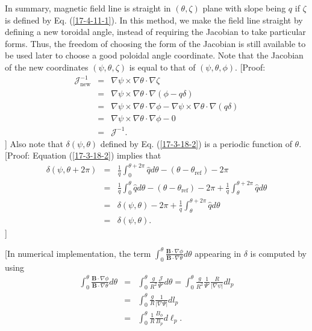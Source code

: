 \documentclass{llncs}
\newcommand{\tmop}[1]{\ensuremath{\operatorname{#1}}}
\begin{document}
In summary, magnetic field line is straight in $(\theta, \zeta)$ plane with
slope being $q$ if $\zeta$ is defined by Eq. (\ref{17-4-11-1}). In this
method, we make the field line straight by defining a new toroidal angle,
instead of requiring the Jacobian to take particular forms. Thus, the freedom
of choosing the form of the Jacobian is still available to be used later to
choose a good poloidal angle coordinate. Note that the Jacobian of the new
coordinates $(\psi, \theta, \zeta)$ is equal to that of $(\psi, \theta,
\phi)$. [Proof:
\begin{eqnarray*}
  \mathcal{J}_{\tmop{new}}^{- 1} & = & \nabla \psi \times \nabla \theta \cdot
  \nabla \zeta\\
  & = & \nabla \psi \times \nabla \theta \cdot \nabla (\phi - q \delta)\\
  & = & \nabla \psi \times \nabla \theta \cdot \nabla \phi - \nabla \psi
  \times \nabla \theta \cdot \nabla (q \delta)\\
  & = & \nabla \psi \times \nabla \theta \cdot \nabla \phi - 0\\
  & = & \mathcal{J}^{- 1} .
\end{eqnarray*}
] Also note that $\delta (\psi, \theta)$ defined by Eq. (\ref{17-3-18-2}) is a
periodic function of $\theta$. [Proof: Equation (\ref{17-3-18-2}) implies that
\begin{eqnarray}
  \delta (\psi, \theta + 2 \pi) & = & \frac{1}{q} \int_0^{\theta + 2 \pi}
  \hat{q} d \theta - (\theta - \theta_{\tmop{ref}}) - 2 \pi \nonumber\\
  & = & \frac{1}{q} \int_0^{\theta} \hat{q} d \theta - (\theta -
  \theta_{\tmop{ref}}) - 2 \pi + \frac{1}{q} \int_{\theta}^{\theta + 2 \pi}
  \hat{q} d \theta \nonumber\\
  & = & \delta (\psi, \theta) - 2 \pi + \frac{1}{q} \int_{\theta}^{\theta + 2
  \pi} \hat{q} d \theta \nonumber\\
  & = & \delta (\psi, \theta) . 
\end{eqnarray}
]

[In numerical implementation, the term $\int_0^{\theta} \frac{\mathbf{B} \cdot
\nabla \phi}{\mathbf{B} \cdot \nabla \theta} d \theta$ appearing in $\delta$
is computed by using
\begin{eqnarray}
  \int_0^{\theta} \frac{\mathbf{B} \cdot \nabla \phi}{\mathbf{B} \cdot \nabla
  \theta} d \theta & = & \int_0^{\theta}  \frac{g}{R^2} 
  \frac{\mathcal{J}}{\Psi'} d \theta = \int_0^{\theta}  \frac{g}{R^2} 
  \frac{1}{\Psi'} \frac{R}{| \nabla \psi |} d l_p \nonumber\\
  & = & \int_0^{\theta}  \frac{g}{R}  \frac{1}{| \nabla \Psi |} d l_p
  \nonumber\\
  & = & \int_0^{\theta}  \frac{1}{R}  \frac{B_{\phi}}{B_p} d \ell_p . 
\end{eqnarray}
\end{document}
